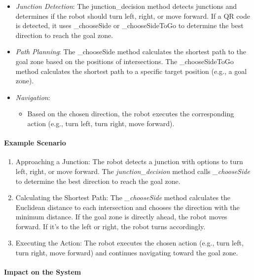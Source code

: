 \documentclass[a4paper,12pt]{extreport}
\begin{document}
\begin{itemize}
\item
  \emph{Junction Detection}: The junction\_decision method detects
  junctions and determines if the robot should turn left, right, or move
  forward. If a QR code is detected, it uses \_chooseSide or
  \_chooseSideToGo to determine the best direction to reach the goal
  zone.
\item
  \emph{Path Planning}: The \_chooseSide method calculates the shortest
  path to the goal zone based on the positions of intersections. The
  \_chooseSideToGo method calculates the shortest path to a specific
  target position (e.g., a goal zone).
\item
  \emph{Navigation}:

  \begin{itemize}
  \item
    Based on the chosen direction, the robot executes the corresponding
    action (e.g., turn left, turn right, move forward).
  \end{itemize}
\end{itemize}

\paragraph{Example Scenario}

\begin{enumerate}
\def\labelenumi{\arabic{enumi}.}
\item
  Approaching a Junction: The robot detects a junction with options to
  turn left, right, or move forward. The \emph{junction\_decision}
  method calls \emph{\_chooseSide} to determine the best direction to
  reach the goal zone.
\item
  Calculating the Shortest Path: The \emph{\_chooseSide} method
  calculates the Euclidean distance to each intersection and chooses the
  direction with the minimum distance. If the goal zone is directly
  ahead, the robot moves forward. If it's to the left or right, the
  robot turns accordingly.
\item
  Executing the Action: The robot executes the chosen action (e.g., turn
  left, turn right, move forward) and continues navigating toward the
  goal zone.
\end{enumerate}
\newpage
\paragraph{Impact on the System}
\end{document}
